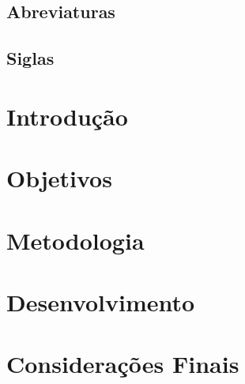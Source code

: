 \documentclass[
	10pt,				%
	openany,
    twoside,			%
	a4paper,			%
    chapter={TITLE},
    section={TITLE},
    subsection={TITLE},
    subsubsection={TITLE},
	english,			%
	french,				%
	spanish,			%
	brazil,				%
	sumario=tradicional
]{abntex2}
\begin{document}
\section*{Abreviaturas}
\begin{acronym}
\end{acronym}

\section*{Siglas}
\begin{acronym}
\end{acronym}

\clearpage


\tableofcontents*


\textual

\setcounter{page}{1}

\chapter{Introdução}
   

\chapter{Objetivos}
    

\chapter{Metodologia}
    

\chapter{Desenvolvimento}
    

\chapter{Considerações Finais}
    
\end{document}
